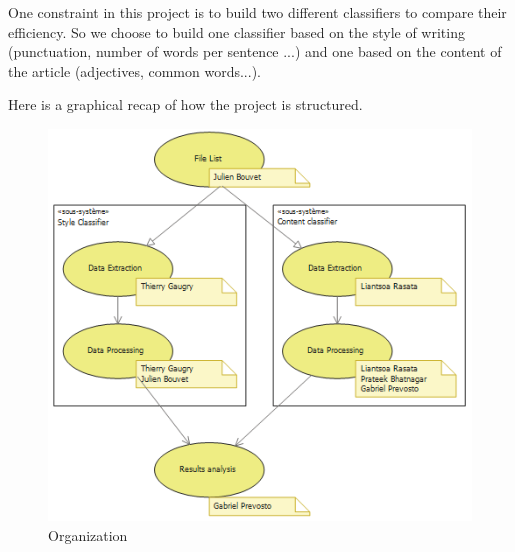 One constraint in this project is to build two different classifiers to compare their efficiency. So we choose to build one classifier based on the style of writing (punctuation, number of words per sentence ...) and one based on the content of the article (adjectives, common words...).

Here is a graphical recap of how the project is structured.
\begin{figure}[h]
	\centering
		\includegraphics{Images/organization.png}
	\caption{Organization}
	\label{fig:organization}
\end{figure}
